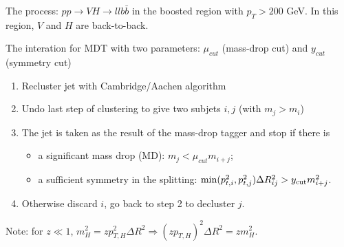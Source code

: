 \documentclass[9pt,a4paper,unknownkeysallowed,xcolor=dvipsnames,aspectratio=43]{beamer}
\begin{document}
\begin{frame}\vspace{2mm}

{\color{darkred}{\Large$\bullet$} The process: $pp\to V H \to ll b\bar{b}$} in the boosted region with $p_T > 200$ GeV. In this region, $V$ and $H$ are back-to-back.
\vspace{4mm}

{\color{darkred}{\Large$\bullet$} The interation for MDT} with two parameters: $\mu_{cut}$ (mass-drop cut) and $y_{cut}$ (symmetry cut) 
\vspace{2mm}
\begin{enumerate}
    \item Recluster jet with Cambridge/Aachen algorithm
    \vspace{2mm}
    \item Undo last step of clustering to give two subjets $i,j$ (with $m_{j} > m_{i}$)
    \vspace{2mm}
    \item The jet is taken as the result of the mass-drop tagger and stop if there is\vspace{2mm}
    \begin{itemize}
        \item[\diamondsuit] a significant mass drop (MD): $m_j < \mu_{cut}m_{i+j}$\vspace{2mm};
        \item[\diamondsuit] a sufficient symmetry in the splitting: ${\rm min}(p_{t,i}^2,p_{t,j}^2)\Delta R_{ij}^2>y_{\rm cut} m_{i+j}^2$.
    \end{itemize}
    \vspace{2mm}
    \item Otherwise discard $i$, go back to step 2 to decluster $j$.
\end{enumerate}
\vspace{2mm}
    Note: for $z\ll1$, $m_H^2 = z p_{T, H}^2 \Delta R^2 \Rightarrow (z p_{T, H})^2 \Delta R^2 = z m_H^2$. 
\end{frame}
%
%
\end{document}
